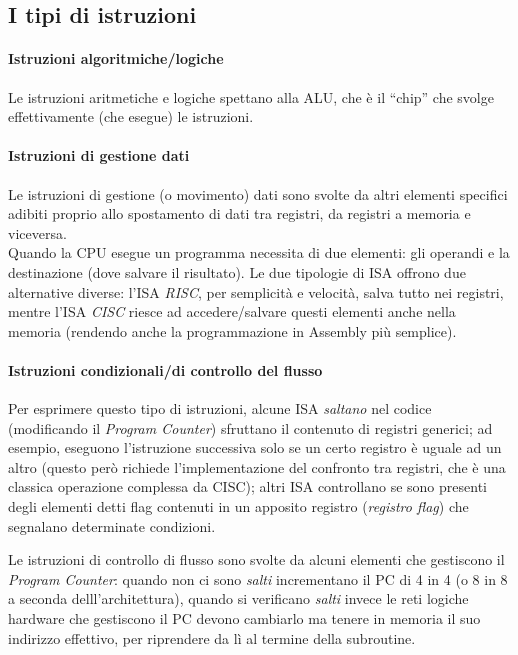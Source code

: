\documentclass[class=book, crop=false]{standalone}
\begin{document}
\subsection{I tipi di istruzioni}

\paragraph*{Istruzioni algoritmiche/logiche}
Le istruzioni aritmetiche e logiche spettano alla ALU, che è il “chip” che svolge effettivamente (che esegue) le istruzioni.

\paragraph*{Istruzioni di gestione dati}
Le istruzioni di gestione (o movimento) dati sono svolte da altri elementi specifici adibiti proprio allo spostamento di dati tra registri, da registri a memoria  e viceversa.\\
Quando la CPU esegue un programma necessita di due elementi: gli operandi e la destinazione (dove salvare il risultato). Le due tipologie di ISA offrono due alternative diverse: l’ISA \emph{RISC}, per semplicità  e velocità, salva tutto nei registri, mentre l’ISA \emph{CISC} riesce ad accedere/salvare questi elementi anche nella memoria (rendendo anche la programmazione in Assembly più semplice).

\paragraph*{Istruzioni condizionali/di controllo del flusso}
Per esprimere questo tipo di istruzioni, alcune ISA \emph{saltano} nel codice (modificando il \emph{Program Counter}) sfruttano il contenuto di registri generici; ad esempio, eseguono l’istruzione successiva solo se un certo registro è uguale ad un altro (questo però richiede l’implementazione del confronto tra registri, che è una classica operazione complessa da CISC); altri ISA controllano se sono presenti  degli elementi detti flag contenuti in un apposito registro (\emph{registro flag}) che segnalano determinate condizioni.

Le istruzioni di controllo di flusso sono svolte da alcuni elementi che gestiscono il \emph{Program Counter}: quando non ci sono \emph{salti} incrementano il PC di 4 in 4 (o 8 in 8 a seconda delll’architettura), quando si verificano \emph{salti} invece le reti logiche hardware che gestiscono il PC devono cambiarlo ma tenere in memoria il suo indirizzo effettivo, per riprendere da lì al termine della subroutine.
\end{document}
